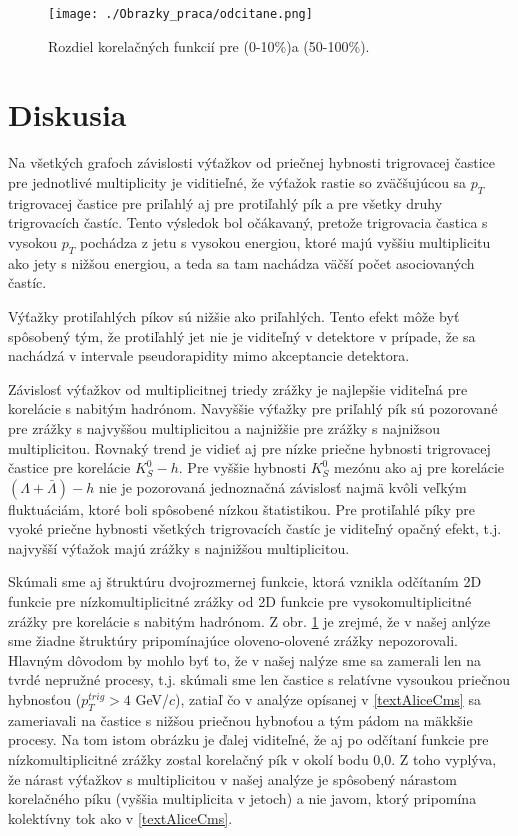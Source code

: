 \documentclass[thesismargins, thesislinespacing]{rnthesis}
\begin{document}
\begin{figure}[hbtp!]
	\centering
	\texttt{[image: ./Obrazky\_praca/odcitane.png]}
	\caption{Rozdiel korelačných funkcií pre (0-10\%)a (50-100\%).}
	\label{multroz}
\end{figure}


\chapter{Diskusia}
 
Na všetkých grafoch závislosti výťažkov od priečnej hybnosti trigrovacej častice pre jednotlivé multiplicity je viditieľné, že výťažok rastie so zväčšujúcou sa $p_T$ trigrovacej častice pre priľahlý aj pre protiľahlý pík a pre všetky druhy trigrovacích častíc. Tento výsledok bol očákavaný, pretože trigrovacia častica s vysokou $p_T$ pochádza z jetu s vysokou energiou, ktoré majú vyššiu multiplicitu ako jety s nižšou energiou, a teda sa tam nachádza väčší počet asociovaných častíc. 

Výťažky protiľahlých píkov sú nižšie ako priľahlých. Tento efekt môže byť spôsobený tým, že protiľahlý jet nie je viditeľný v detektore v prípade, že sa nachádzá v intervale pseudorapidity mimo akceptancie detektora. 

Závislosť výťažkov od multiplicitnej triedy zrážky je najlepšie viditeľná pre korelácie s nabitým hadrónom. Navyššie výťažky pre priľahlý pík sú pozorované pre zrážky s najvyššou multiplicitou a najnižšie pre zrážky s najnižsou multiplicitou. Rovnaký trend je vidieť aj pre nízke priečne hybnosti trigrovacej častice pre korelácie  $K^0_S-h$. Pre vyššie hybnosti $K^{0}_{S}$ mezónu ako aj pre korelácie $(\Lambda+\bar{\Lambda}) -h$ nie je pozorovaná jednoznačná závislosť najmä kvôli veľkým fluktuáciám, ktoré boli spôsobené nízkou štatistikou. Pre protiľahlé píky pre vyoké priečne hybnosti všetkých trigrovacích častíc je viditeľný opačný efekt, t.j. najvyšší výťažok majú zrážky s najnižšou multiplicitou.  
  
Skúmali sme aj štruktúru dvojrozmernej funkcie, ktorá vznikla odčítaním 2D funkcie pre nízkomultiplicitné zrážky od 2D funk\-cie pre vysokomultiplicitné zrážky pre korelácie s nabitým hadrónom. Z obr. \ref{multroz} je zrejmé, že v našej anlýze sme žiadne štruktúry pripomínajúce oloveno-olovené zrážky nepozorovali. Hlavným dôvodom by mohlo byť to, že v našej nalýze sme sa zamerali len na tvrdé nepružné procesy, t.j. skúmali sme len častice s relatívne vysoukou priečnou hybnosťou ($p_{T}^{trig}>4$ GeV/$c$), zatiaľ čo v analýze opísanej v \ref{textAliceCms} sa zameriavali na častice s nižšou priečnou hybnoťou a tým pádom na mäkkšie procesy. 
Na tom istom obrázku je ďalej viditeľné, že aj po odčítaní funkcie pre nízkomultiplicitné zrážky zostal korelačný pík v okolí bodu 0,0. Z toho vyplýva, že nárast výťažkov s multiplicitou v našej analýze je spôsobený nárastom korelačného píku (vyššia multiplicita v jetoch) a nie javom, ktorý pripomína kolektívny tok ako v \ref{textAliceCms}.
\end{document}
